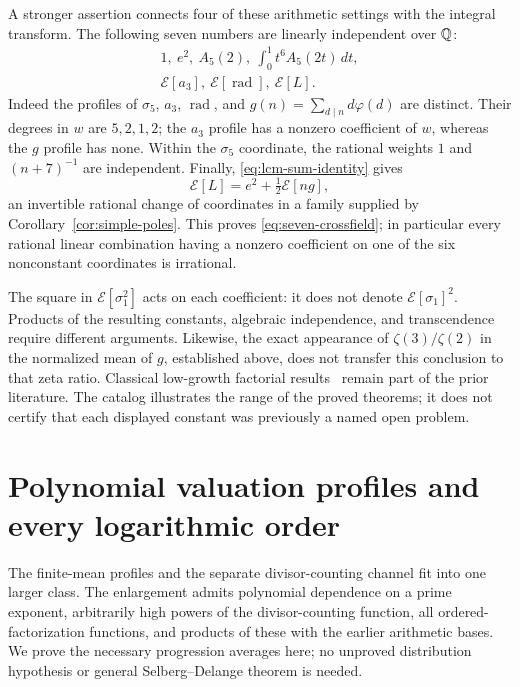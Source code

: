 A stronger assertion connects four of these arithmetic settings
with the integral transform.  The following seven numbers are
linearly independent over $\mathbb Q$:
\begin{equation}\label{eq:seven-crossfield}
 \boxed{\begin{gathered}
 1,\ e^2,\ A_5(2),\ \int_0^1t^6A_5(2t)\,dt,\\[3pt]
 \mathcal E[a_3],\ \mathcal E[\operatorname{rad}],\
 \mathcal E[L].
 \end{gathered}}
\end{equation}
Indeed the profiles of $\sigma_5$, $a_3$, $\operatorname{rad}$,
and $g(n)=\sum_{d\mid n}d\varphi(d)$ are distinct.  Their degrees
in $w$ are $5,2,1,2$; the $a_3$ profile has a nonzero coefficient
of $w$, whereas the $g$ profile has none.  Within the $\sigma_5$
coordinate, the rational weights $1$ and $(n+7)^{-1}$ are
independent.  Finally, \eqref{eq:lcm-sum-identity} gives
\[
 \mathcal E[L]=e^2+\tfrac12\mathcal E[n g],
\]
an invertible rational change of coordinates in a family supplied
by Corollary~\ref{cor:simple-poles}.  This proves
\eqref{eq:seven-crossfield}; in particular every rational linear
combination having a nonzero coefficient on one of the six
nonconstant coordinates is irrational.

The square in $\mathcal E[\sigma_1^2]$ acts on each coefficient:
it does not denote $\mathcal E[\sigma_1]^2$.  Products of the
resulting constants, algebraic independence, and transcendence
require different arguments.  Likewise, the exact appearance of
$\zeta(3)/\zeta(2)$ in the normalized mean of $g$, established
above, does not transfer this conclusion to that zeta ratio.
Classical low-growth factorial results~\cite{HT10} remain part of
the prior literature.  The catalog illustrates the range of the
proved theorems; it does not certify that each displayed constant
was previously a named open problem.


\section{Polynomial valuation profiles and every logarithmic order}
\label{sec:v5-log-profiles}

The finite-mean profiles and the separate divisor-counting channel fit into
one larger class. The enlargement admits polynomial dependence on a prime
exponent, arbitrarily high powers of the divisor-counting function, all
ordered-factorization functions, and products of these with the earlier
arithmetic bases. We prove the necessary progression averages here; no
unproved distribution hypothesis or general Selberg--Delange theorem is
needed.

